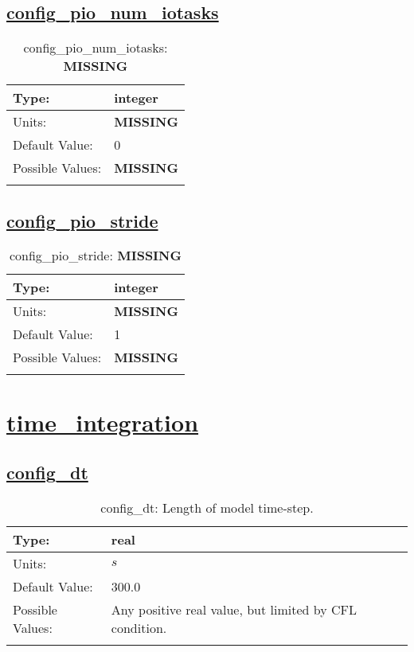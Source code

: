 \subsection[config\_pio\_num\_iotasks]{\hyperref[sec:nm_tab_io]{config\_pio\_num\_iotasks}}
\label{subsec:nm_sec_config_pio_num_iotasks}
\begin{center}
\begin{longtable}{| p{2.0in} | p{4.0in} |}
    \hline
    Type: & integer \\
    \hline
    Units: & {\bf \color{red} MISSING} \\
    \hline
    Default Value: & 0 \\
    \hline
    Possible Values: & {\bf \color{red} MISSING} \\
    \hline
    \caption{config\_pio\_num\_iotasks: {\bf \color{red} MISSING}}
\end{longtable}
\end{center}
\subsection[config\_pio\_stride]{\hyperref[sec:nm_tab_io]{config\_pio\_stride}}
\label{subsec:nm_sec_config_pio_stride}
\begin{center}
\begin{longtable}{| p{2.0in} | p{4.0in} |}
    \hline
    Type: & integer \\
    \hline
    Units: & {\bf \color{red} MISSING} \\
    \hline
    Default Value: & 1 \\
    \hline
    Possible Values: & {\bf \color{red} MISSING} \\
    \hline
    \caption{config\_pio\_stride: {\bf \color{red} MISSING}}
\end{longtable}
\end{center}
\section[time\_integration]{\hyperref[sec:nm_tab_time_integration]{time\_integration}}
\label{sec:nm_sec_time_integration}
\subsection[config\_dt]{\hyperref[sec:nm_tab_time_integration]{config\_dt}}
\label{subsec:nm_sec_config_dt}
\begin{center}
\begin{longtable}{| p{2.0in} | p{4.0in} |}
    \hline
    Type: & real \\
    \hline
    Units: & $s$ \\
    \hline
    Default Value: & 300.0 \\
    \hline
    Possible Values: & Any positive real value, but limited by CFL condition. \\
    \hline
    \caption{config\_dt: Length of model time-step.}
\end{longtable}
\end{center}
